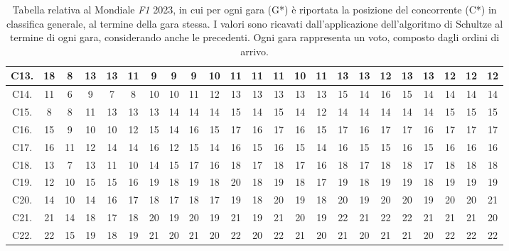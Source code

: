 \documentclass[12pt,a4paper,openright,twoside]{book}
\begin{document}
\begin{table}[H]
{\begin{tabular}{|c|c|c|c|c|c|c|c|c|c|c|c|c|c|c|c|c|c|c|c|c|c|c|}
C13.  & 18 & 8 & 13 & 13 & 11 & 9 & 9 & 9 & 10 & 11 & 11 & 11 & 10 & 11 & 13 & 13 & 12 & 13 & 13 & 12 & 12 & 12 \\ \hline
C14.  & 11 & 6 & 9 & 7 & 8 & 10 & 10 & 11 & 12 & 13 & 13 & 13 & 13 & 13 & 15 & 14 & 16 & 15 & 14 & 14 & 14 & 14 \\ \hline
C15. & 8 & 8 & 11 & 13 & 13 & 13 & 14 & 14 & 14 & 15 & 14 & 15 & 14 & 12 & 14 & 14 & 14 & 14 & 14 & 15 & 15 & 15 \\ \hline
C16.  & 15 & 9 & 10 & 10 & 12 & 15 & 14 & 16 & 15 & 17 & 16 & 17 & 16 & 15 & 17 & 16 & 17 & 17 & 16 & 17 & 17 & 17 \\ \hline
C17.  & 16 & 11 & 12 & 14 & 14 & 16 & 12 & 15 & 14 & 16 & 15 & 16 & 15 & 14 & 16 & 15 & 15 & 16 & 15 & 16 & 16 & 16 \\ \hline
C18.  & 13 & 7 & 13 & 11 & 10 & 14 & 15 & 17 & 16 & 18 & 17 & 18 & 17 & 16 & 18 & 17 & 18 & 18 & 17 & 18 & 18 & 18 \\ \hline
C19.  & 12 & 10 & 15 & 15 & 16 & 19 & 18 & 19 & 18 & 20 & 18 & 19 & 18 & 17 & 19 & 18 & 19 & 19 & 18 & 19 & 19 & 19 \\ \hline
C20.  & 14 & 10 & 14 & 16 & 17 & 18 & 17 & 18 & 17 & 19 & 18 & 20 & 19 & 18 & 20 & 19 & 20 & 20 & 19 & 20 & 20 & 21 \\ \hline
C21.  & 21 & 14 & 18 & 17 & 18 & 20 & 19 & 20 & 19 & 21 & 19 & 21 & 20 & 19 & 22 & 21 & 22 & 22 & 21 & 21 & 21 & 20 \\ \hline
C22.  & 22 & 15 & 19 & 18 & 19 & 21 & 20 & 21 & 20 & 22 & 20 & 22 & 21 & 20 & 21 & 20 & 21 & 21 & 20 & 22 & 22 & 22 \\ \hline
    \end{tabular}}
    \endgroup

    \caption{Tabella relativa al Mondiale \textit{F1} 2023, in cui per ogni gara (G*)  è riportata la posizione del concorrente (C*) in classifica generale, al termine della gara stessa.
    I valori sono ricavati dall'applicazione dell'algoritmo di Schultze al termine di ogni gara, considerando anche le precedenti.
    Ogni gara rappresenta un voto, composto dagli ordini di arrivo.
    }
    \label{table:classifichegeneralischultze2023tabella}
\end{table}
\end{document}
